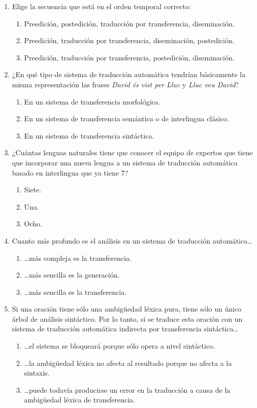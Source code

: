 \begin{enumerate}
\item Elige la secuencia que está en el orden temporal correcto: \begin{enumerate} \item Preedición, postedición, traducción por transferencia, diseminación. \item Preedición, traducción por transferencia, diseminación, postedición. \item Preedición, traducción por transferencia, postedición, diseminación. \end{enumerate} 

\item ¿En qué tipo de sistema de traducción automática tendrían básicamente la misma representación las frases \emph{David és vist per Lluc} y \emph{Lluc veu David}? \begin{enumerate} \item En un sistema de transferencia morfológica. \item En un sistema de transferencia semántica o de interlingua clásico. \item En un sistema de transferencia sintáctica. \end{enumerate} 

\item ¿Cuántas lenguas naturales tiene que conocer el equipo de expertos que tiene que incorporar una nueva lengua a un sistema de traducción automática basado en interlingua que ya tiene 7? \begin{enumerate} \item Siete. \item Una. \item Ocho. \end{enumerate} 

\item Cuanto más profundo es el análisis en un sistema de traducción automática{\ldots} \begin{enumerate} \item {\ldots}más compleja es la transferencia. \item {\ldots}más sencilla es la generación. \item {\ldots}más sencilla es la transferencia. \end{enumerate} 

\item Si una oración tiene sólo una ambigüedad léxica pura, tiene sólo un único árbol de análisis sintáctico. Por lo tanto, si se traduce esta oración con un sistema de traducción automática indirecta por transferencia sintáctica{\ldots} \begin{enumerate} \item {\ldots}el sistema se bloqueará porque sólo opera a nivel sintáctico. \item {\ldots}la ambigüedad léxica no afecta al resultado porque no afecta a la sintaxis. \item {\ldots}puede todavía producirse un error en la traducción a causa de la ambigüedad léxica de transferencia. \end{enumerate} 


\end{enumerate}

